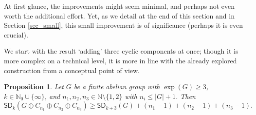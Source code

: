 \documentclass{amsart}
\newtheorem{pro}[thm]{Proposition}
\theoremstyle{definition}
\numberwithin{equation}{section}
\begin{document}
At first glance, the improvements might seem minimal, and perhaps not even
worth the additional effort. Yet, as we detail at the end of this section and
in Section \ref{sec_small}, this small improvement is of significance (perhaps it is even crucial).

We start with the result `adding' three cyclic components at once;
though it is more complex on a technical level, it is more
in line with the already explored construction from a conceptual point of view.

\begin{pro}
\label{pro_cn4}
Let $G$ be a finite abelian group with $\exp(G)\ge 3$, $k \in \mathbb{N}_0 \cup \{\infty\}$,
and $n_1,n_2,n_3 \in \mathbb{N}\setminus \{1,2\}$ with $n_i \le |G|+1$.
Then
\[
{\mathsf{SD}}_k(G \oplus C_{n_1}\oplus C_{n_2}\oplus C_{n_3})\ge {\mathsf{SD}}_{k+3}(G)+(n_1-1)+(n_2-1)+(n_3-1).
\]
\end{pro}
\end{document}
